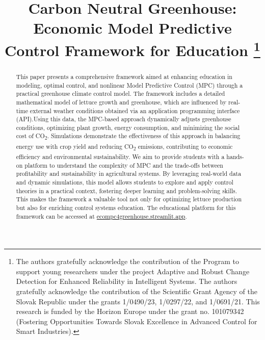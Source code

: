 \documentclass[conference]{IEEEtran}
\begin{document}
\title{Carbon Neutral Greenhouse: Economic Model Predictive Control Framework for Education
    \thanks{The authors gratefully acknowledge the contribution of the Program to support young researchers under the project Adaptive and Robust Change Detection for Enhanced Reliability in Intelligent Systems. The authors gratefully acknowledge the contribution of the Scientific Grant Agency of the Slovak Republic under the grants 1/0490/23, 1/0297/22, and 1/0691/21. This research is funded by the Horizon Europe under the grant no. 101079342 (Fostering Opportunities Towards Slovak Excellence in Advanced Control for Smart Industries).}
}

\author{
}

\maketitle

\begin{abstract}
    This paper presents a comprehensive framework aimed at enhancing education in modeling, optimal control, and nonlinear Model Predictive Control (MPC) through a practical greenhouse climate control model. The framework includes a detailed mathematical model of lettuce growth and greenhouse, which are influenced by real-time external weather conditions obtained via an application programming interface (API).\@ Using this data, the MPC-based approach dynamically adjusts greenhouse conditions, optimizing plant growth, energy consumption, and minimizing the social cost of CO\textsubscript{2}. Simulations demonstrate the effectiveness of this approach in balancing energy use with crop yield and reducing CO\textsubscript{2} emissions, contributing to economic efficiency and environmental sustainability.
    We aim to provide students with a hands-on platform to understand the complexity of MPC and the trade-offs between profitability and sustainability in agricultural systems. By leveraging real-world data and dynamic simulations, this model allows students to explore and apply control theories in a practical context, fostering deeper learning and problem-solving skills. This makes the framework a valuable tool not only for optimizing lettuce production but also for enriching control systems education. The educational platform for this framework can be accessed at \url{ecompc4greenhouse.streamlit.app}.
\end{abstract}
\end{document}
